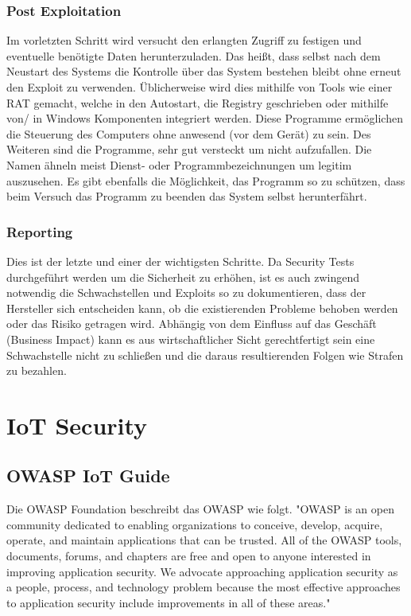         \subsubsection{\glqq Post Exploitation\grqq{}}
        Im vorletzten Schritt wird versucht den erlangten Zugriff zu festigen und eventuelle benötigte Daten herunterzuladen. Das heißt, dass selbst nach dem Neustart des Systems die Kontrolle über das System bestehen bleibt ohne erneut den Exploit zu verwenden. Üblicherweise wird dies mithilfe von Tools wie einer \ac{RAT} gemacht, welche in den Autostart, die Registry geschrieben oder mithilfe von/ in Windows Komponenten integriert werden.
        Diese Programme ermöglichen die Steuerung des Computers ohne anwesend (vor dem Gerät) zu sein. Des Weiteren sind die Programme, sehr gut versteckt um nicht aufzufallen. Die Namen ähneln meist Dienst- oder Programmbezeichnungen um legitim auszusehen. Es gibt ebenfalls die Möglichkeit, das Programm so zu schützen, dass beim Versuch das Programm zu beenden das System selbst herunterfährt.
    \subsubsection{\glqq Reporting\grqq{}}
        Dies ist der letzte und einer der wichtigsten Schritte. Da Security Tests durchgeführt werden um die Sicherheit zu erhöhen, ist es auch zwingend notwendig die Schwachstellen und Exploits so zu dokumentieren, dass der Hersteller sich entscheiden kann, ob die existierenden Probleme behoben werden oder das Risiko getragen wird. Abhängig von dem Einfluss auf das Geschäft (Business Impact) kann es aus wirtschaftlicher Sicht gerechtfertigt sein eine Schwachstelle nicht zu schließen und die daraus resultierenden Folgen wie Strafen zu bezahlen.

\section{IoT Security}
    \subsection{OWASP IoT Guide}
    Die OWASP Foundation \cite{guzman_2019} beschreibt das \ac{OWASP} wie folgt.
    "OWASP is an open community dedicated to enabling organizations to conceive, develop, acquire, operate, and maintain applications that can be trusted. All of the OWASP tools, documents, forums, and chapters are free and open to anyone interested in improving application security. We advocate approaching application security as a people, process, and technology problem because the most effective approaches to application security include improvements in all of these areas."
    
